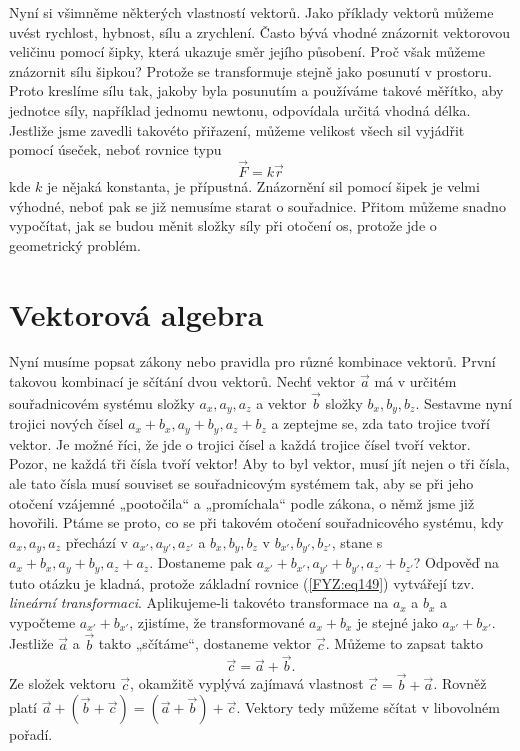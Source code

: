     Nyní si všimněme některých vlastností vektorů. Jako příklady vektorů můžeme uvést rychlost, 
    hybnost, sílu a zrychlení. Často bývá vhodné znázornit vektorovou veličinu pomocí šipky, která 
    ukazuje směr jejího působení. Proč však můžeme znázornit sílu šipkou? Protože se transformuje 
    stejně jako posunutí v prostoru. Proto kreslíme sílu tak, jakoby byla posunutím a používáme 
    takové měřítko, aby jednotce síly, například jednomu newtonu, odpovídala určitá vhodná délka. 
    Jestliže jsme zavedli takovéto přiřazení, můžeme velikost všech sil vyjádřit pomocí úseček, 
    neboť rovnice typu
    \begin{equation*}
     \vec{F} = k\vec{r}
    \end{equation*}
    kde \(k\) je nějaká konstanta, je přípustná. Znázornění sil pomocí šipek je velmi výhodné, 
    neboť pak se již nemusíme starat o souřadnice. Přitom můžeme snadno vypočítat, jak se budou 
    měnit složky síly při otočení os, protože jde o geometrický problém.
    
  \section{Vektorová algebra}
    Nyní musíme popsat zákony nebo pravidla pro různé kombinace vektorů. První takovou kombinací je 
    sčítání dvou vektorů. Nechť vektor \(\vec{a}\) má v určitém souřadnicovém systému složky \(a_x, 
    a_y, a_z\) a vektor \(\vec{b}\) složky \(b_x, b_y, b_z\). Sestavme nyní trojici nových čísel 
    \(a_x + b_x, a_y + b_y, a_z + b_z\) a zeptejme se, zda tato trojice tvoří vektor. Je možné 
    říci, že jde o trojici čísel a každá trojice čísel tvoří vektor. Pozor, ne každá tři čísla 
    tvoří vektor! Aby to byl vektor, musí jít nejen o tři čísla, ale tato čísla musí souviset se 
    souřadnicovým systémem tak, aby se při jeho otočení vzájemné „pootočila“ a „promíchala“ podle 
    zákona, o němž jsme již hovořili. Ptáme se proto, co se při takovém otočení souřadnicového 
    systému, kdy \(a_x, a_y, a_z\) přechází v \(a_{x'}, a_{y'}, a_{z'}\) a \(b_x, b_y, b_z\) v 
    \(b_{x'}, b_{y'}, b_{z'}\), stane s \(a_x + b_x, a_y + b_y, a_z + a_z\). Dostaneme pak \(a_{x'} 
    + b_{x'}, a_{y'} + b_{y'}, a_{z'} + b_{z'}\)? Odpověď na tuto otázku je kladná, protože 
    základní rovnice (\ref{FYZ:eq149}) vytvářejí tzv. \emph{lineární transformaci}. Aplikujeme-li 
    takovéto transformace na \(a_x\) a \(b_x\) a vypočteme \(a_{x'} + b_{x'}\), zjistíme, že 
    transformované \(a_x + b_x\) je stejné jako \(a_{x'} + b_{x'}\). Jestliže \(\vec{a}\) a 
    \(\vec{b}\) takto „sčítáme“, dostaneme vektor \(\vec{c}\). Můžeme to zapsat takto
    \begin{equation*}
     \vec{c} = \vec{a} + \vec{b}.
    \end{equation*}
    Ze složek vektoru \(\vec{c}\), okamžitě vyplývá zajímavá vlastnost \(\vec{c} = \vec{b} + 
    \vec{a}\). Rovněž platí \(\vec{a} + (\vec{b} + \vec{c}) = (\vec{a} + \vec{b}) + \vec{c}\). 
    Vektory tedy můžeme sčítat v libovolném pořadí.
    

